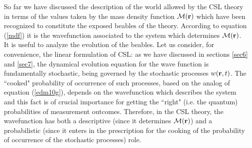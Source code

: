 \documentclass[12pt]{article}
\begin{document}
So far we have discussed the description of the world allowed by
the CSL theory in terms of the values taken by the mass density
function ${\mathcal M}({\bf r})$ which have been recognized to
constitute the exposed beables of the theory. According to
equation (\ref{mdf}) it is the wavefunction associated to the
system which determines ${\mathcal M}({\bf r})$. It is useful to
analyze the evolution of the beables. Let us consider, for
convenience, the linear formulation of CSL: as we have discussed
in sections \ref{sec6} and \ref{sec7}, the dynamical evolution
equation for the wave function is fundamentally stochastic, being
governed by the stochastic processes $w({\bf r},t)$. The ``cooked"
probability of occurrence of such processes, based on the analog
of equation (\ref{edm10g}), depends on the wavefunction which
describes the system and this fact is of crucial importance for
getting the ``right" (i.e. the quantum) probabilities of
measurement outcomes. Therefore, in the CSL theory, the
wavefunction has both a descriptive (since it determines
${\mathcal M}({\bf r})$) and a probabilistic (since it enters in
the prescription for the cooking of the probability of occurrence
of the stochastic processes) role.
\end{document}
